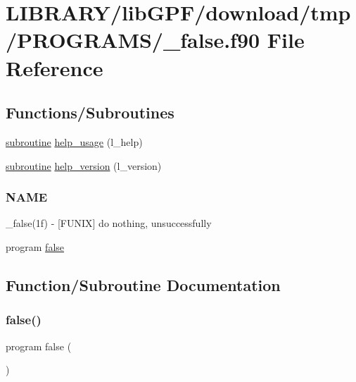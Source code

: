 \hypertarget{__false_8f90}{}\section{L\+I\+B\+R\+A\+R\+Y/lib\+G\+P\+F/download/tmp/\+P\+R\+O\+G\+R\+A\+M\+S/\+\_\+false.f90 File Reference}
\label{__false_8f90}
\subsection*{Functions/\+Subroutines}
\begin{DoxyCompactItemize}
\item 
\hyperlink{M__stopwatch_83_8txt_acfbcff50169d691ff02d4a123ed70482}{subroutine} \hyperlink{__false_8f90_a3e09a3b52ee8fb04eeb93fe5761626a8}{help\+\_\+usage} (l\+\_\+help)
\item 
\hyperlink{M__stopwatch_83_8txt_acfbcff50169d691ff02d4a123ed70482}{subroutine} \hyperlink{__false_8f90_a39c21619b08a3c22f19e2306efd7f766}{help\+\_\+version} (l\+\_\+version)
\begin{DoxyCompactList}\small\item\em \subsubsection*{N\+A\+ME}

\+\_\+false(1f) -\/ \mbox{[}F\+U\+N\+IX\mbox{]} do nothing, unsuccessfully \end{DoxyCompactList}\item 
program \hyperlink{__false_8f90_ac39cd9fe2012c31749944aa6b20b6c05}{false}
\end{DoxyCompactItemize}


\subsection{Function/\+Subroutine Documentation}
\mbox{\label{__false_8f90_ac39cd9fe2012c31749944aa6b20b6c05}} 
\subsubsection{\texorpdfstring{false()}{false()}}
{\footnotesize\ttfamily program false (\begin{DoxyParamCaption}{ }\end{DoxyParamCaption})}



